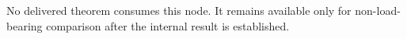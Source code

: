 No delivered theorem consumes this node. It remains available only for non-load-bearing comparison after the internal result is established.